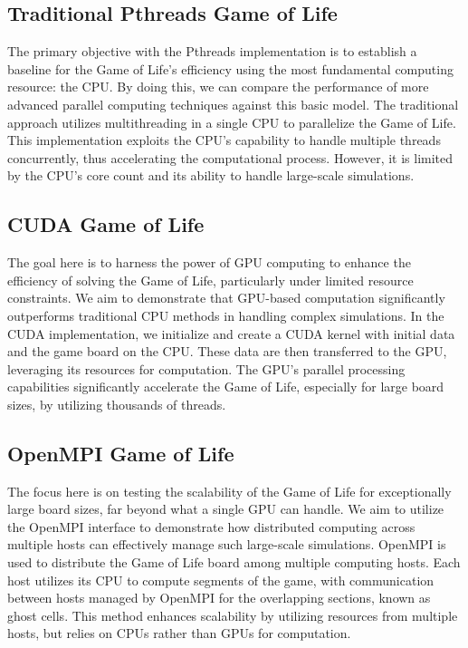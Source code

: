 \documentclass[11pt,twocolumn]{article}
\begin{document}
\subsection{Traditional Pthreads Game of Life} The primary objective with the Pthreads implementation is to establish a baseline for the Game of Life's efficiency using the most fundamental computing resource: the CPU. By doing this, we can compare the performance of more advanced parallel computing techniques against this basic model. The traditional approach utilizes multithreading in a single CPU to parallelize the Game of Life. This implementation exploits the CPU's capability to handle multiple threads concurrently, thus accelerating the computational process. However, it is limited by the CPU's core count and its ability to handle large-scale simulations. 

\subsection{CUDA Game of Life} The goal here is to harness the power of GPU computing to enhance the efficiency of solving the Game of Life, particularly under limited resource constraints. We aim to demonstrate that GPU-based computation significantly outperforms traditional CPU methods in handling complex simulations. In the CUDA implementation, we initialize and create a CUDA kernel with initial data and the game board on the CPU. These data are then transferred to the GPU, leveraging its resources for computation. The GPU's parallel processing capabilities significantly accelerate the Game of Life, especially for large board sizes, by utilizing thousands of threads.

\subsection{OpenMPI Game of Life} The focus here is on testing the scalability of the Game of Life for exceptionally large board sizes, far beyond what a single GPU can handle. We aim to utilize the OpenMPI interface to demonstrate how distributed computing across multiple hosts can effectively manage such large-scale simulations. OpenMPI is used to distribute the Game of Life board among multiple computing hosts. Each host utilizes its CPU to compute segments of the game, with communication between hosts managed by OpenMPI for the overlapping sections, known as ghost cells. This method enhances scalability by utilizing resources from multiple hosts, but relies on CPUs rather than GPUs for computation.
\end{document}
